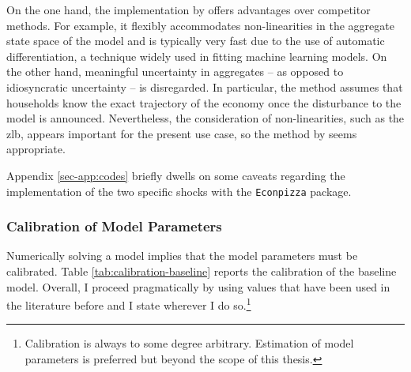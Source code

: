 \documentclass[12pt]{article} %
\numberwithin{equation}{section} %
\begin{document}
On the one hand, the implementation by \textcite{boehl2023econpizza} offers advantages over competitor methods. For example, it flexibly accommodates non-linearities in the aggregate state space of the model and is typically very fast due to the use of automatic differentiation, a technique widely used in fitting machine learning models. On the other hand, meaningful uncertainty in aggregates -- as opposed to idiosyncratic uncertainty -- is disregarded. In particular, the method assumes that households know the exact trajectory of the economy once the disturbance to the model is announced. Nevertheless, the consideration of non-linearities, such as the \Gls{zlb}, appears important for the present use case, so the method by \textcite{boehl2023econpizza} seems appropriate.

Appendix \ref{sec-app:codes} briefly dwells on some caveats regarding the implementation of the two specific shocks with the \texttt{Econpizza} package.

\subsubsection*{Calibration of Model Parameters}

Numerically solving a model implies that the model parameters must be calibrated. Table \ref{tab:calibration-baseline} reports the calibration of the baseline model. Overall, I proceed pragmatically by using values that have been used in the literature before and I state wherever I do so.\footnote{Calibration is always to some degree arbitrary. Estimation of model parameters is preferred but beyond the scope of this thesis.}
\end{document}
